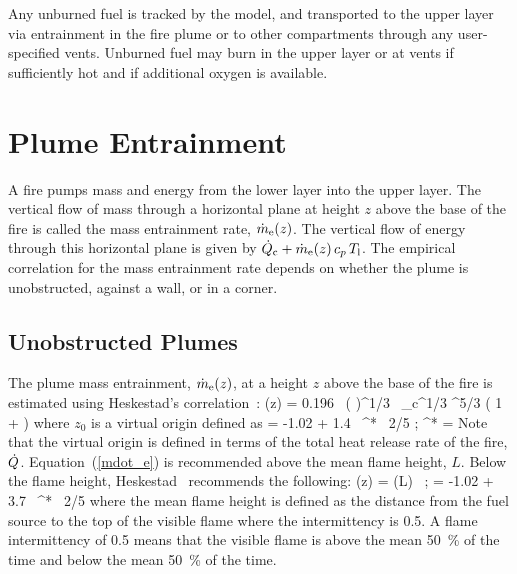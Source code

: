 \documentclass[12pt]{book}
\begin{document}
Any unburned fuel is tracked by the model, and transported to the upper layer via entrainment in the fire plume or to other compartments through any user-specified vents. Unburned fuel may burn in the upper layer or at vents if sufficiently hot and if additional oxygen is available.



\section{Plume Entrainment}

A fire pumps mass and energy from the lower layer into the upper layer. The vertical flow of mass through a horizontal plane at height $z$ above the base of the fire is called the mass entrainment rate, $\dot{m}_{\rm e}(z)$. The vertical flow of energy through this horizontal plane is given by $\dot{Q}_{\rm c} + \dot{m}_{\rm e}(z) \, c_p \, T_{\rm l}$. The empirical correlation for the mass entrainment rate depends on whether the plume is unobstructed, against a wall, or in a corner.

\subsection{Unobstructed Plumes}

The plume mass entrainment, $\dot{m}_{\rm e}(z)$, at a height $z$ above the base of the fire is estimated using Heskestad's correlation~\cite{Heskestad:2002}:
\be
   \dme(z) = 0.196 \, \left(  \right)^{1/3} \, \dQ_{\rm c}^{1/3} \; ^{5/3} \;
   \left( 1 +  \right) \label{mdot_e}
\ee
where $z_0$ is a virtual origin defined as
\be
    = -1.02 + 1.4 \, \dQ^{* \, 2/5} \quad ; \quad \dQ^* =  \label{virtual_origin}
\ee
Note that the virtual origin is defined in terms of the total heat release rate of the fire, $\dot{Q}$. Equation~(\ref{mdot_e}) is recommended above the mean flame height, $L$. Below the flame height, Heskestad~\cite{Heskestad:2002} recommends the following:
\be
  \dme(z) = \dme(L) \,  \quad ; \quad {} = -1.02 + 3.7 \, \dQ^{* \, 2/5}
\ee
where the mean flame height is defined as the distance from the fuel source to the top of the visible flame where the intermittency is 0.5.  A flame intermittency of 0.5 means that the visible flame is above the mean 50~\% of the time and below the mean 50~\% of the time.
\end{document}

